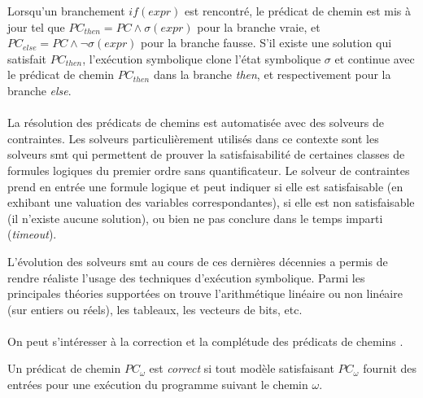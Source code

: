             Lorsqu'un branchement $if( expr )$ est rencontré, le prédicat de chemin est mis à jour tel que $PC_{then} = PC \wedge \sigma(expr)$ pour la branche vraie, et $PC_{else} = PC \wedge \neg \sigma(expr)$ pour la branche fausse. S'il existe une solution qui satisfait $PC_{then}$, l'exécution symbolique clone l'état symbolique $\sigma$ et continue avec le prédicat de chemin $PC_{then}$ dans la branche \textit{then}, et respectivement pour la branche \textit{else}.
            
            \paragraph{}            
            La résolution des prédicats de chemins est automatisée avec des solveurs de contraintes. 
            Les solveurs particulièrement utilisés dans ce contexte sont les solveurs \gls{smt} \cite{DeMoura/ACM11, Barrett/HMC18} qui permettent de prouver la satisfaisabilité de certaines classes de formules logiques du premier ordre sans quantificateur. Le solveur de contraintes prend en entrée une formule logique et peut indiquer si elle est satisfaisable (en exhibant une valuation des variables correspondantes), si elle est non satisfaisable (il n'existe aucune solution), ou bien ne pas conclure dans le temps imparti (\textit{timeout}). 
            
            L'évolution des solveurs \gls{smt} au cours de ces dernières décennies a permis de rendre réaliste l'usage des techniques d'exécution symbolique. Parmi les principales théories supportées on trouve l'arithmétique linéaire ou non linéaire (sur entiers ou réels), les tableaux, les vecteurs de bits, etc. 
            
            \paragraph{}            
            \begin{sloppypar}   
            On peut s'intéresser à la correction et la complétude des prédicats de chemins \cite{Godefroid/PLDI11}.
            \end{sloppypar}   
            
            \begin{defi}
            \label{def:pc-sound}
                Un prédicat de chemin $PC_{\omega}$ est \textit{correct} si tout modèle satisfaisant $PC_{\omega}$ fournit des entrées pour une exécution du programme suivant le chemin $\omega$.
            \end{defi}
            
